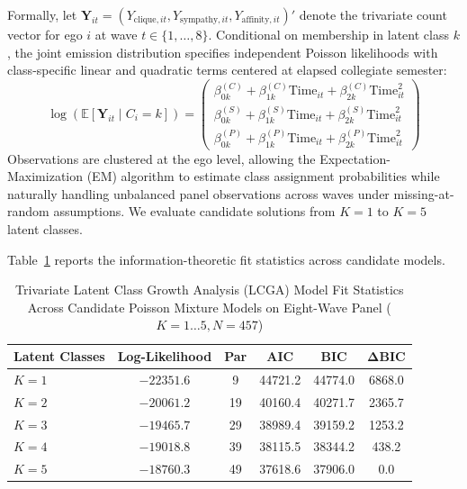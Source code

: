 \documentclass[12pt]{article}
\begin{document}
Formally, let $\mathbf{Y}_{it} = (Y_{\text{clique}, it}, Y_{\text{sympathy}, it}, Y_{\text{affinity}, it})'$ denote the trivariate count vector for ego $i$ at wave $t \in \{1, \dots, 8\}$. Conditional on membership in latent class $k$, the joint emission distribution specifies independent Poisson likelihoods with class-specific linear and quadratic terms centered at elapsed collegiate semester:
\begin{equation}
\log(\mathbb{E}[\mathbf{Y}_{it} \mid C_i = k]) = \begin{pmatrix} \beta_{0k}^{(C)} + \beta_{1k}^{(C)} \text{Time}_{it} + \beta_{2k}^{(C)} \text{Time}_{it}^2 \\ \beta_{0k}^{(S)} + \beta_{1k}^{(S)} \text{Time}_{it} + \beta_{2k}^{(S)} \text{Time}_{it}^2 \\ \beta_{0k}^{(P)} + \beta_{1k}^{(P)} \text{Time}_{it} + \beta_{2k}^{(P)} \text{Time}_{it}^2 \end{pmatrix}
\end{equation}
Observations are clustered at the ego level, allowing the Expectation-Maximization (EM) algorithm to estimate class assignment probabilities while naturally handling unbalanced panel observations across waves under missing-at-random assumptions. We evaluate candidate solutions from $K = 1$ to $K = 5$ latent classes.

Table~\ref{tab:biv_lcga} reports the information-theoretic fit statistics across candidate models.

\begin{table}[htbp]
\centering
\small
\caption{Trivariate Latent Class Growth Analysis (LCGA) Model Fit Statistics Across Candidate Poisson Mixture Models on Eight-Wave Panel ($K = 1 \dots 5, N = 457$)}
\label{tab:biv_lcga}
\begin{tabular}{lccccc}
\toprule
\textbf{Latent Classes} & \textbf{Log-Likelihood} & \textbf{Par} & \textbf{AIC} & \textbf{BIC} & $\boldsymbol{\Delta}$\textbf{BIC} \\
\midrule
$K = 1$ & $-22351.6$ & 9  & 44721.2 & 44774.0 & 6868.0 \\
$K = 2$ & $-20061.2$ & 19 & 40160.4 & 40271.7 & 2365.7 \\
$K = 3$ & $-19465.7$ & 29 & 38989.4 & 39159.2 & 1253.2 \\
$K = 4$ & $-19018.8$ & 39 & 38115.5 & 38344.2 & 438.2 \\
$K = 5$ & $-18760.3$ & 49 & 37618.6 & 37906.0 & 0.0 \\
\bottomrule
\end{tabular}
\end{table}
\end{document}
